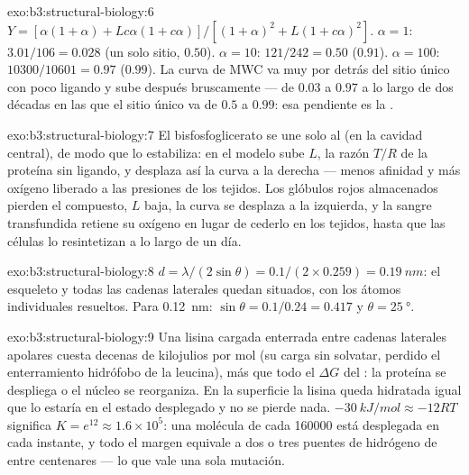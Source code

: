 \begin{solution}{exo:b3:structural-biology:6}
$Y = [\alpha(1+\alpha) + Lc\alpha(1+c\alpha)]/[(1+\alpha)^{2} +
L(1+c\alpha)^{2}]$. $\alpha = 1$: $3.01/106 = 0.028$ (un solo sitio,
$0.50$). $\alpha = 10$: $121/242 = 0.50$ ($0.91$). $\alpha = 100$:
$\num{10300}/\num{10601} = 0.97$ ($0.99$). La curva de MWC va muy por
detrás del sitio único con poco ligando y sube después bruscamente ---
de $0.03$ a $0.97$ a lo largo de dos décadas en las que el sitio único va
de $0.5$ a $0.99$: esa pendiente es la .
\end{solution}

\begin{solution}{exo:b3:structural-biology:7}
El bisfosfoglicerato se une solo al  (en la cavidad central), de
modo que lo estabiliza: en el modelo sube $L$, la razón $T/R$ de la
proteína sin ligando, y desplaza así la curva a la derecha --- menos
afinidad y más oxígeno liberado a las presiones de los tejidos. Los
glóbulos rojos almacenados pierden el compuesto, $L$ baja, la curva se
desplaza a la izquierda, y la sangre transfundida retiene su oxígeno en
lugar de cederlo en los tejidos, hasta que las células lo resintetizan a
lo largo de un día.
\end{solution}

\begin{solution}{exo:b3:structural-biology:8}
$d = \lambda/(2\sin\theta) = 0.1/(2\times 0.259) = \qty{0.19}{nm}$: el
esqueleto y todas las cadenas laterales quedan situados, con los átomos
individuales resueltos. Para \qty{0.12}{nm}:
$\sin\theta = 0.1/0.24 = 0.417$ y $\theta =
\qty{25}{\degree}$.
\end{solution}

\begin{solution}{exo:b3:structural-biology:9}
Una lisina cargada enterrada entre cadenas laterales apolares cuesta
decenas de kilojulios por mol (su carga sin solvatar, perdido el
enterramiento hidrófobo de la leucina), más que todo el $\Delta G$ del
: la proteína se despliega o el núcleo se reorganiza. En la
superficie la lisina queda hidratada igual que lo estaría en el estado
desplegado y no se pierde nada.
$\qty{-30}{kJ/mol} \approx -12RT$ significa $K = e^{12} \approx 1.6\times
10^{5}$: una molécula de cada \num{160000} está desplegada en cada
instante, y todo el margen equivale a dos o tres puentes de hidrógeno de
entre centenares --- lo que vale una sola mutación.
\end{solution}

